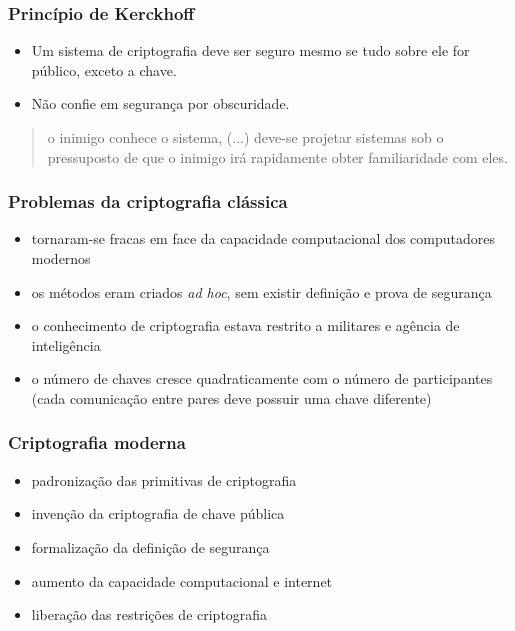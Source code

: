 \begin{frame}
\frametitle{Princípio de Kerckhoff}
\begin{itemize}
\item Um sistema de criptografia deve ser seguro mesmo se tudo sobre ele for público, exceto a chave.
\item Não confie em segurança por obscuridade.
\end{itemize}

\vspace{2ex}
\begin{quote}
o inimigo conhece o sistema, (...) deve-se projetar sistemas sob o pressuposto de que o inimigo
irá rapidamente obter familiaridade com eles.
\end{quote}


\end{frame}

\begin{frame}
\frametitle{Problemas da criptografia clássica}
\begin{itemize}
\item tornaram-se fracas em face da capacidade computacional dos computadores modernos
\item os métodos eram criados \emph{ad hoc}, sem existir definição e prova de segurança
\item o conhecimento de criptografia estava restrito a militares e agência de inteligência
\item o número de chaves cresce quadraticamente com o número de participantes (cada comunicação entre pares deve possuir uma chave diferente)
\end{itemize}
\end{frame}

\begin{frame}
\frametitle{Criptografia moderna}
\begin{itemize}
\item padronização das primitivas de criptografia
\item invenção da criptografia de chave pública
\item formalização da definição de segurança
\item aumento da capacidade computacional e internet
\item liberação das restrições de criptografia
\end{itemize}
\end{frame}


